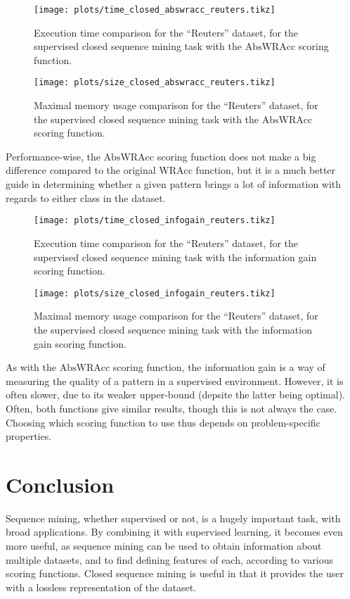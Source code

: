 \documentclass{sigkddExp}
\newcommand{\wracc}{\mathrm{WRAcc}}
\newcommand{\abswracc}{\mathrm{AbsWRAcc}}
\begin{document}
\begin{figure}[!hbtp]
	\centering
	\texttt{[image: plots/time\_closed\_abswracc\_reuters.tikz]}
	\caption{Execution time comparison for the ``Reuters'' dataset, for the supervised closed sequence mining task with the \(\abswracc\) scoring function.}
	\label{fig:time_closed_abswracc_reuters}
\end{figure}%
\begin{figure}[!hbtp]
	\centering
	\texttt{[image: plots/size\_closed\_abswracc\_reuters.tikz]}
	\caption{Maximal memory usage comparison for the ``Reuters'' dataset, for the supervised closed sequence mining task with the \(\abswracc\) scoring function.}
	\label{fig:size_closed_abswracc_reuters}
\end{figure}
Performance-wise, the \(\abswracc\) scoring function does not make a big difference compared to the original \(\wracc\) function, but it is a much better guide in determining whether a given pattern brings a lot of information with regards to either class in the dataset.

\begin{figure}[!hbtp]
	\centering
	\texttt{[image: plots/time\_closed\_infogain\_reuters.tikz]}
	\caption{Execution time comparison for the ``Reuters'' dataset, for the supervised closed sequence mining task with the information gain scoring function.}
	\label{fig:time_closed_infogain_reuters}
\end{figure}
\begin{figure}[!hbtp]
	\centering
	\texttt{[image: plots/size\_closed\_infogain\_reuters.tikz]}
	\caption{Maximal memory usage comparison for the ``Reuters'' dataset, for the supervised closed sequence mining task with the information gain scoring function.}
	\label{fig:size_closed_infogain_reuters}
\end{figure}

As with the \(\abswracc\) scoring function, the information gain is a way of measuring the quality of a pattern in a supervised environment.
However, it is often slower, due to its weaker upper-bound (depsite the latter being optimal).
Often, both functions give similar results, though this is not always the case.
Choosing which scoring function to use thus depends on problem-specific properties.

\section{Conclusion}
Sequence mining, whether supervised or not, is a hugely important task, with broad applications.
By combining it with supervised learning, it becomes even more useful, as sequence mining can be used to obtain information about multiple datasets, and to find defining features of each, according to various scoring functions.
Closed sequence mining is useful in that it provides the user with a lossless representation of the dataset.
\end{document}
